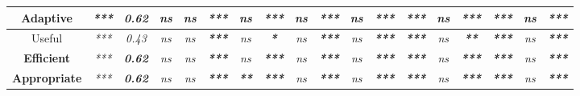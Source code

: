 \begin{sidewaystable}
\begin{tabular}{c|cc|ccccccccccccccc|}
    \multicolumn{1}{|c|}{\textbf{Adaptive}}      & \multicolumn{1}{c|}{\textit{***}} & \textit{\textbf{0.62}} & \multicolumn{1}{c|}{\textit{ns}} & \multicolumn{1}{c|}{\textit{ns}} & \multicolumn{1}{c|}{\textit{\textbf{***}}} & \multicolumn{1}{c|}{\textit{ns}}          & \multicolumn{1}{c|}{\textit{\textbf{***}}} & \multicolumn{1}{c|}{\textit{ns}} & \multicolumn{1}{c|}{\textit{\textbf{***}}} & \multicolumn{1}{c|}{\textit{ns}} & \multicolumn{1}{c|}{\textit{\textbf{***}}} & \multicolumn{1}{c|}{\textit{\textbf{***}}} & \multicolumn{1}{c|}{\textit{ns}}         & \multicolumn{1}{c|}{\textit{\textbf{***}}} & \multicolumn{1}{c|}{\textit{\textbf{***}}} & \multicolumn{1}{c|}{\textit{ns}} & \textit{\textbf{***}} \\ \hline
    \multicolumn{1}{|c|}{Useful}                 & \multicolumn{1}{c|}{\textit{***}} & \textit{0.43}          & \multicolumn{1}{c|}{\textit{ns}} & \multicolumn{1}{c|}{\textit{ns}} & \multicolumn{1}{c|}{\textit{\textbf{***}}} & \multicolumn{1}{c|}{\textit{ns}}          & \multicolumn{1}{c|}{\textit{\textbf{*}}}   & \multicolumn{1}{c|}{\textit{ns}} & \multicolumn{1}{c|}{\textit{\textbf{***}}} & \multicolumn{1}{c|}{\textit{ns}} & \multicolumn{1}{c|}{\textit{\textbf{***}}} & \multicolumn{1}{c|}{\textit{\textbf{***}}} & \multicolumn{1}{c|}{\textit{ns}}         & \multicolumn{1}{c|}{\textit{\textbf{**}}}  & \multicolumn{1}{c|}{\textit{\textbf{***}}} & \multicolumn{1}{c|}{\textit{ns}} & \textit{\textbf{***}} \\ \hline
    \multicolumn{1}{|c|}{\textbf{Efficient}}     & \multicolumn{1}{c|}{\textit{***}} & \textit{\textbf{0.62}} & \multicolumn{1}{c|}{\textit{ns}} & \multicolumn{1}{c|}{\textit{ns}} & \multicolumn{1}{c|}{\textit{\textbf{***}}} & \multicolumn{1}{c|}{\textit{ns}}          & \multicolumn{1}{c|}{\textit{\textbf{***}}} & \multicolumn{1}{c|}{\textit{ns}} & \multicolumn{1}{c|}{\textit{\textbf{***}}} & \multicolumn{1}{c|}{\textit{ns}} & \multicolumn{1}{c|}{\textit{\textbf{***}}} & \multicolumn{1}{c|}{\textit{\textbf{***}}} & \multicolumn{1}{c|}{\textit{ns}}         & \multicolumn{1}{c|}{\textit{\textbf{***}}} & \multicolumn{1}{c|}{\textit{\textbf{***}}} & \multicolumn{1}{c|}{\textit{ns}} & \textit{\textbf{***}} \\ \hline
    \multicolumn{1}{|c|}{\textbf{Appropriate}}   & \multicolumn{1}{c|}{\textit{***}} & \textit{\textbf{0.62}} & \multicolumn{1}{c|}{\textit{ns}} & \multicolumn{1}{c|}{\textit{ns}} & \multicolumn{1}{c|}{\textit{\textbf{***}}} & \multicolumn{1}{c|}{\textit{\textbf{**}}} & \multicolumn{1}{c|}{\textit{\textbf{***}}} & \multicolumn{1}{c|}{\textit{ns}} & \multicolumn{1}{c|}{\textit{\textbf{***}}} & \multicolumn{1}{c|}{\textit{ns}} & \multicolumn{1}{c|}{\textit{\textbf{***}}} & \multicolumn{1}{c|}{\textit{\textbf{***}}} & \multicolumn{1}{c|}{\textit{ns}}         & \multicolumn{1}{c|}{\textit{\textbf{***}}} & \multicolumn{1}{c|}{\textit{\textbf{***}}} & \multicolumn{1}{c|}{\textit{ns}} & \textit{\textbf{***}} \\ \hline

\end{tabular}
\end{sidewaystable}
